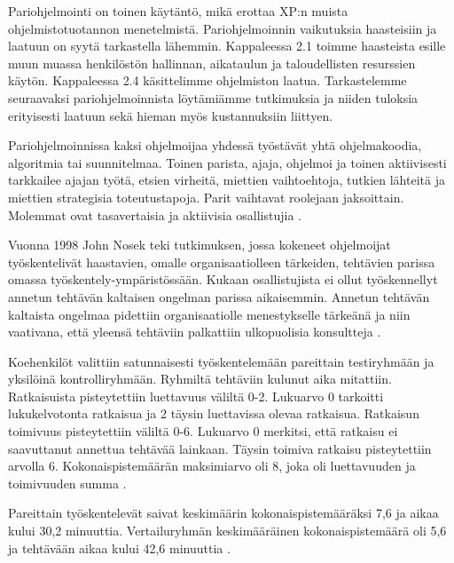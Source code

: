 \documentclass[finnish]{tktltiki2}
\theoremstyle{definition}
\theoremstyle{remark}
\begin{document}
{Pariohjelmointi on toinen käytäntö, mikä erottaa XP:n muista ohjelmistotuotannon menetelmistä. Pariohjelmoinnin vaikutuksia haasteisiin ja laatuun on syytä tarkastella lähemmin. Kappaleessa 2.1 toimme haasteista esille muun muassa henkilöstön hallinnan, aikataulun ja taloudellisten resurssien käytön. Kappaleessa 2.4 käsittelimme ohjelmiston laatua. Tarkastelemme seuraavaksi pariohjelmoinnista löytämiämme tutkimuksia ja niiden tuloksia erityisesti laatuun sekä hieman myös kustannuksiin liittyen.

Pariohjelmoinnissa kaksi ohjelmoijaa yhdessä työstävät yhtä ohjelmakoodia, algoritmia tai suunnitelmaa. Toinen parista, ajaja, ohjelmoi ja toinen aktiivisesti tarkkailee ajajan työtä, etsien virheitä, miettien vaihtoehtoja, tutkien lähteitä ja miettien strategisia toteutustapoja. Parit vaihtavat roolejaan jaksoittain. Molemmat ovat tasavertaisia ja aktiivisia osallistujia \cite{WIL00}.

Vuonna 1998 John Nosek teki tutkimuksen, jossa kokeneet ohjelmoijat työskentelivät haastavien, omalle organisaatiolleen tärkeiden, tehtävien parissa omassa työskentely-ympäristössään. Kukaan osallistujista ei ollut työskennellyt annetun tehtävän kaltaisen ongelman parissa aikaisemmin. Annetun tehtävän kaltaista ongelmaa pidettiin organisaatiolle menestykselle tärkeänä ja niin vaativana, että yleensä tehtäviin palkattiin ulkopuolisia konsultteja \cite{NOS98}.

Koehenkilöt valittiin satunnaisesti työskentelemään pareittain testiryhmään ja yksilöinä kontrolliryhmään.
Ryhmiltä tehtäviin kulunut aika mitattiin. Ratkaisuista pisteytettiin luettavuus väliltä 0-2. Lukuarvo 0 tarkoitti lukukelvotonta ratkaisua ja 2 täysin luettavissa olevaa ratkaisua. Ratkaisun toimivuus pisteytettiin väliltä 0-6. Lukuarvo 0 merkitsi, että ratkaisu ei saavuttanut annettua tehtävää lainkaan. Täysin toimiva ratkaisu pisteytettiin arvolla 6. Kokonaispistemäärän maksimiarvo oli 8, joka oli luettavuuden ja toimivuuden summa \cite{NOS98}.

Pareittain työskentelevät saivat keskimäärin kokonaispistemääräksi 7,6 ja aikaa kului 30,2 minuuttia. Vertailuryhmän keskimääräinen kokonaispistemäärä oli 5,6 ja tehtävään aikaa kului 42,6 minuuttia \cite{NOS98}.

}
\end{document}
